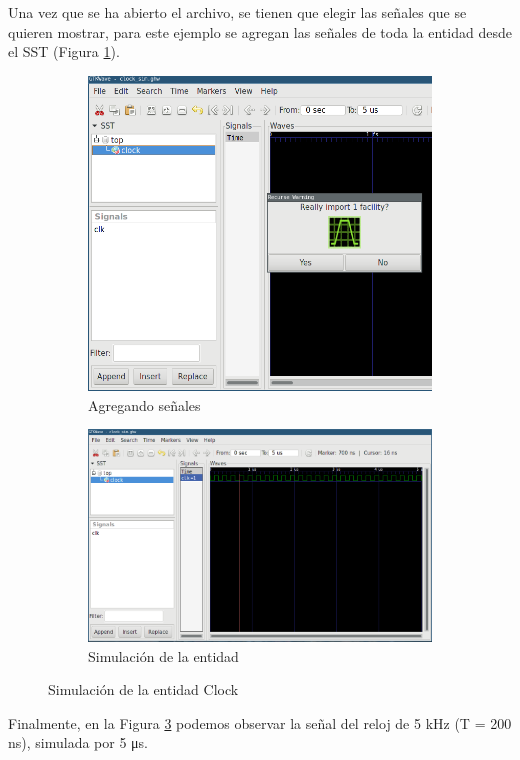 \documentclass[11pt]{article}
\begin{document}
Una vez que se ha abierto el archivo, se tienen que elegir las señales que se
quieren mostrar, para este ejemplo se agregan las señales de toda la
entidad desde el SST (Figura \ref{fig:gtkwave-2}).

\begin{figure}[H]
\begin{subfigure}[c]{.5\linewidth}
    \centering
    \includegraphics[height=.62\textwidth]{gtkwave2a.png}
    \caption{Agregando señales}
    \label{fig:gtkwave-2}
\end{subfigure}
\begin{subfigure}[c]{.5\linewidth}
    \centering
    \includegraphics[height=.62\textwidth]{gtkwave3.png}
    \caption{Simulación de la entidad}
    \label{fig:gtkwave-3}
\end{subfigure}
\caption{Simulación de la entidad Clock}
\end{figure}

Finalmente, en la Figura \ref{fig:gtkwave-3} podemos observar la señal del 
reloj de 5 \unit{\kilo\hertz} (T = 200 \unit{\nano\second}), simulada por 5
\unit{\micro\second}.
\end{document}
